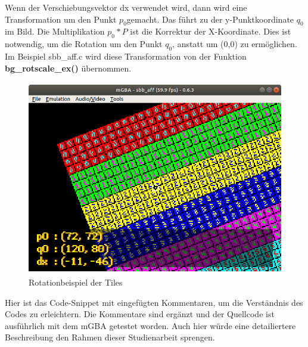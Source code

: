 Wenn der Verschiebungsvektor dx verwendet wird, dann wird eine Transformation um den Punkt $p_{0}$gemacht. Das führt zu der y-Punktkoordinate $q_{0}$im Bild. Die Multiplikation $p_{0}* P$ ist die Korrektur der X-Koordinate. Dies ist notwendig, um die Rotation um den Punkt $q_{0}$, anstatt um (0,0) zu ermöglichen. Im Beispiel sbb\_aff.c wird diese Transformation von der Funktion \textbf{bg\_rotscale\_ex()} übernommen. \citep{matrixp}
\begin{figure}[h]
	\centering
	\includegraphics[height=85mm]{img/rotation.png}
	\caption{Rotationbeispiel der Tiles}
	\label{rotation}
\end{figure}

Hier ist das Code-Snippet mit eingefügten Kommentaren, um die Verständnis des Codes zu erleichtern. Die Kommentare sind ergänzt und der Quellcode ist ausführlich mit dem mGBA getestet worden. Auch hier würde eine detailiertere Beschreibung den Rahmen dieser Studienarbeit sprengen.
 
